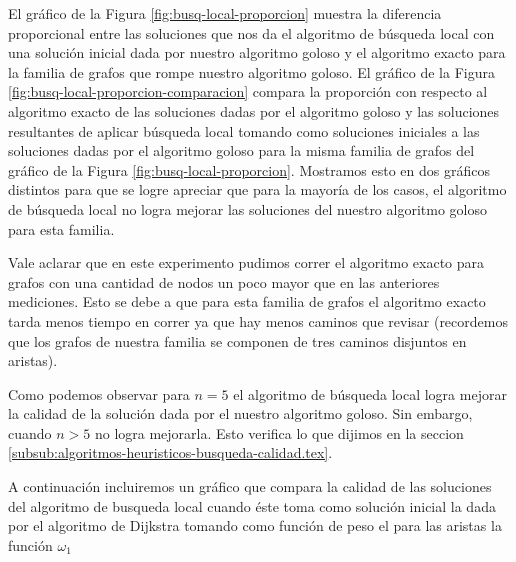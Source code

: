 El gráfico de la Figura \ref{fig:busq-local-proporcion} muestra la diferencia proporcional entre las soluciones que nos da el algoritmo de búsqueda local con una solución inicial dada por nuestro algoritmo goloso y el algoritmo exacto para la familia de grafos que rompe nuestro algoritmo goloso. El gráfico de la Figura \ref{fig:busq-local-proporcion-comparacion} compara la proporción con respecto al algoritmo exacto de las soluciones dadas por el algoritmo goloso y las soluciones resultantes de aplicar búsqueda local tomando como soluciones iniciales a las soluciones dadas por el algoritmo goloso para la misma familia de grafos del gráfico de la Figura \ref{fig:busq-local-proporcion}. Mostramos esto en dos gráficos distintos para que se logre apreciar que para la mayoría de los casos, el algoritmo de búsqueda local no logra mejorar las soluciones del nuestro algoritmo goloso para esta familia.

Vale aclarar que en este experimento pudimos correr el algoritmo exacto para grafos con una cantidad de nodos un poco mayor que en las anteriores mediciones. Esto se debe a que para esta familia de grafos el algoritmo exacto tarda menos tiempo en correr ya que hay menos caminos que revisar (recordemos que los grafos de nuestra familia se componen de tres caminos disjuntos en aristas).

Como podemos observar para $n =5$ el algoritmo de búsqueda local logra mejorar la calidad de la solución dada por el nuestro algoritmo goloso. Sin embargo, cuando $n > 5$ no logra mejorarla. Esto verifica lo que dijimos en la seccion \ref{subsub:algoritmos-heuristicos-busqueda-calidad.tex}.

A continuación incluiremos un gráfico que compara la calidad de las soluciones del algoritmo de busqueda local cuando éste toma como solución inicial la dada por el algoritmo de Dijkstra tomando como función de peso el para las aristas la función $\omega_1$

